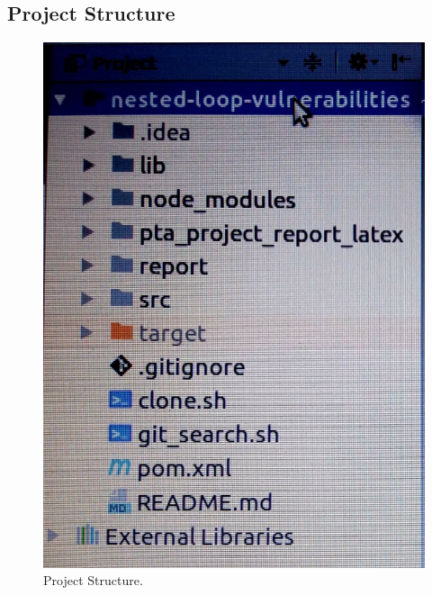 \documentclass[authoryear,preprint]{sigplanconf}
\begin{document}
\subsection{Project Structure}

\begin{figure}[ht]
\centering
\includegraphics[width=1\linewidth]{figures/structure}
\caption[Project Structure]{\label{f:structure}Project Structure.}
\end{figure}
\end{document}
